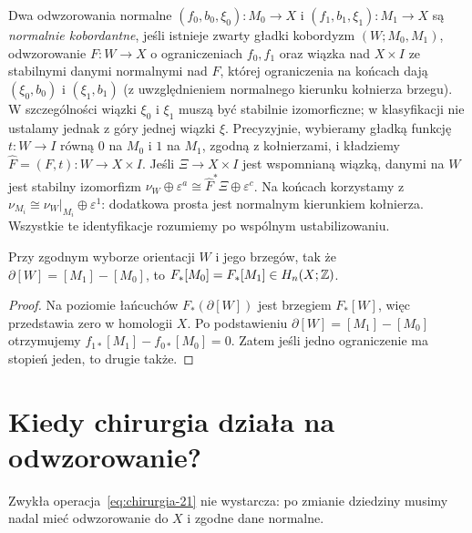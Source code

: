 \begin{definicja}
\label{def:normal-bordism-21}
Dwa odwzorowania normalne $(f_0,b_0,\xi_0):M_0\to X$
i $(f_1,b_1,\xi_1):M_1\to X$ są \emph{normalnie
kobordantne}, jeśli istnieje zwarty gładki kobordyzm
$(W;M_0,M_1)$, odwzorowanie $F:W\to X$
o ograniczeniach $f_0,f_1$ oraz wiązka
nad $X\times I$ ze stabilnymi danymi normalnymi
nad $F$, której ograniczenia na końcach dają
$(\xi_0,b_0)$ i $(\xi_1,b_1)$ (z uwzględnieniem
normalnego kierunku kołnierza brzegu).
W szczególności wiązki $\xi_0$ i $\xi_1$
muszą być stabilnie izomorficzne; w klasyfikacji
nie ustalamy jednak z góry jednej wiązki $\xi$.
Precyzyjnie, wybieramy gładką funkcję $t:W\to I$
równą $0$ na $M_0$ i $1$ na $M_1$, zgodną z kołnierzami,
i kładziemy $\widehat F=(F,t):W\to X\times I$.
Jeśli $\Xi\to X\times I$ jest wspomnianą wiązką,
danymi na $W$ jest stabilny izomorfizm
$\nu_W\oplus\varepsilon^a\cong\widehat F^*\Xi\oplus\varepsilon^c$.
Na końcach korzystamy z
$\nu_{M_i}\cong\nu_W|_{M_i}\oplus\varepsilon^1$:
dodatkowa prosta jest normalnym kierunkiem kołnierza.
Wszystkie te identyfikacje rozumiemy po wspólnym ustabilizowaniu.
\end{definicja}

\begin{stwierdzenie}
\label{prop:stopien-kobordancja-21}
Przy zgodnym wyborze orientacji $W$ i jego brzegów,
tak że
$\partial[W]=[M_1]-[M_0]$, to
$F_*[M_0]=F_*[M_1]\in H_n(X;\mathbb{Z})$.
\end{stwierdzenie}
\begin{proof}
Na poziomie łańcuchów $F_*(\partial[W])$
jest brzegiem $F_*[W]$, więc przedstawia zero
w homologii $X$. Po podstawieniu
$\partial[W]=[M_1]-[M_0]$ otrzymujemy
$f_{1*}[M_1]-f_{0*}[M_0]=0$.
Zatem jeśli jedno ograniczenie ma stopień jeden,
to drugie także.
\end{proof}

\section{Kiedy chirurgia działa na odwzorowanie?}
\label{sec:normalny-krok-21}

Zwykła operacja~\eqref{eq:chirurgia-21} nie
wystarcza: po zmianie dziedziny musimy nadal
mieć odwzorowanie do $X$ i zgodne dane normalne.

